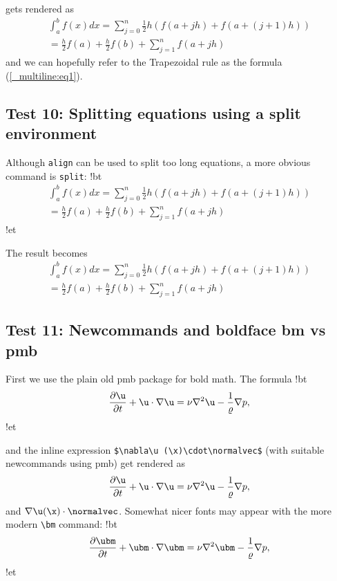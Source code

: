 \documentclass[%
oneside,                 %
final,                   %
10pt]{article}
\begin{document}
\elatexcod

gets rendered as
\begin{multline}
\int_a^b f(x)dx = \sum_{j=0}^{n} \frac{1}{2} h(f(a+jh) +
f(a+(j+1)h)) \\ 
=\frac{h}{2}f(a) + \frac{h}{2}f(b) + \sum_{j=1}^n f(a+jh)
\label{_multiline:eq1}
\end{multline}
and we can hopefully refer to the Trapezoidal rule
as the formula (\ref{_multiline:eq1}).
\subsection{Test 10: Splitting equations using a split environment}
Although \texttt{align} can be used to split too long equations, a more obvious
command is \texttt{split}:
\blatexcod
!bt
\begin{equation}
\begin{split}
\int_a^b f(x)dx = \sum_{j=0}^{n} \frac{1}{2} h(f(a+jh) +
f(a+(j+1)h)) \\ 
=\frac{h}{2}f(a) + \frac{h}{2}f(b) + \sum_{j=1}^n f(a+jh)
\end{split}
\end{equation}
!et

\elatexcod

The result becomes
\begin{equation}
\begin{split}
\int_a^b f(x)dx = \sum_{j=0}^{n} \frac{1}{2} h(f(a+jh) +
f(a+(j+1)h)) \\ 
=\frac{h}{2}f(a) + \frac{h}{2}f(b) + \sum_{j=1}^n f(a+jh)
\end{split}
\end{equation}
\subsection{Test 11: Newcommands and boldface bm vs pmb}
First we use the plain old pmb package for bold math. The formula
\blatexcod
!bt
\[ \frac{\partial\u}{\partial t} +
\u\cdot\nabla\u = \nu\nabla^2\u -
\frac{1}{\varrho}\nabla p,\]
!et

\elatexcod

and the inline expression \Verb!$\nabla\u (\x)\cdot\normalvec$!
(with suitable newcommands using pmb)
get rendered as
\[ \frac{\partial\u}{\partial t} +
\u\cdot\nabla\u = \nu\nabla^2\u -
\frac{1}{\varrho}\nabla p,\]
and $\nabla\u (\x)\cdot\normalvec$.
Somewhat nicer fonts may appear with the more modern \Verb!\bm! command:
\blatexcod
!bt
\[ \frac{\partial\ubm}{\partial t} +
\ubm\cdot\nabla\ubm = \nu\nabla^2\ubm -
\frac{1}{\varrho}\nabla p,\]
!et
\end{document}
